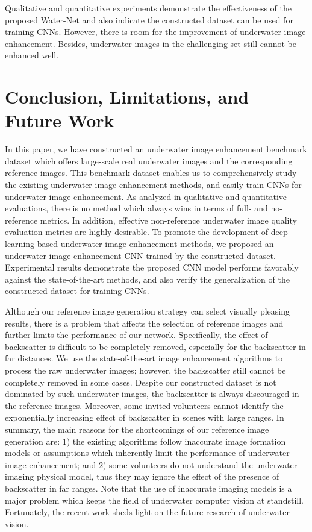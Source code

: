 \documentclass[journal]{IEEEtran}
\begin{document}
Qualitative and quantitative experiments demonstrate the effectiveness of the proposed Water-Net and also indicate the constructed dataset can be used for training CNNs. However, there is room for the improvement of underwater image enhancement. Besides, underwater images in the challenging set still cannot be enhanced well.





\section{Conclusion, Limitations, and Future Work}

In this paper, we have constructed an underwater image enhancement benchmark dataset which offers large-scale real underwater images and the corresponding reference images. This benchmark dataset enables us to comprehensively study the existing underwater image enhancement methods, and easily train CNNs for underwater image enhancement.
As analyzed in qualitative and quantitative evaluations, there is no method which always wins in terms of full- and no-reference metrics.
In addition, effective non-reference underwater image quality evaluation metrics are highly desirable. To promote the development of deep learning-based underwater image enhancement methods, we proposed an underwater image enhancement CNN trained by the constructed dataset. Experimental results demonstrate the proposed CNN model performs favorably against the state-of-the-art methods, and also verify the generalization of the constructed dataset for training CNNs.

Although our reference image generation strategy can select visually pleasing results, there is a problem that affects the selection of reference images and further limits the performance of our network. Specifically, the effect of backscatter is difficult to be completely removed, especially for the backscatter in far distances. We use the state-of-the-art image enhancement algorithms to process the raw underwater images; however, the backscatter still cannot be completely removed in some cases. Despite our constructed dataset is not dominated by such underwater images, the backscatter is always discouraged in the reference images. Moreover, some invited volunteers cannot identify the exponentially increasing effect of backscatter in scenes with large ranges. In summary, the main reasons for the shortcomings of our reference image generation  are: 1) the existing algorithms follow inaccurate image formation models or assumptions which inherently limit the performance of underwater image enhancement; and 2) some volunteers do not understand the underwater imaging physical model, thus they may ignore the effect of the presence of backscatter in far ranges.  Note that the use of inaccurate imaging models is a major problem which keeps the field of underwater computer vision at standstill. Fortunately, the recent work \cite{Akkaynak2019} sheds light on the future research of underwater vision.
\end{document}
